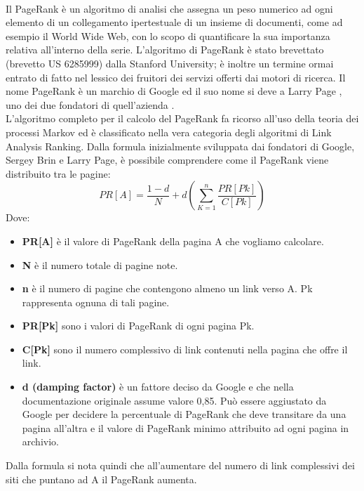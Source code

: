 \\Il PageRank è un algoritmo di analisi che assegna un peso numerico ad ogni elemento di un collegamento ipertestuale di un insieme di documenti, come ad esempio il World Wide Web, con lo scopo di quantificare la sua importanza relativa all'interno della serie. L'algoritmo di PageRank è stato brevettato (brevetto US 6285999) dalla Stanford University; è inoltre un termine ormai entrato di fatto nel lessico dei fruitori dei servizi offerti dai motori di ricerca. Il nome PageRank è un marchio di Google ed il suo nome si deve a Larry Page \cite{pageRank:google}, uno dei due fondatori di quell'azienda \cite{wiki:pageRank}.
\\L'algoritmo completo per il calcolo del PageRank fa ricorso all'uso della teoria dei processi Markov ed è classificato nella vera categoria degli algoritmi di Link Analysis Ranking. Dalla formula inizialmente sviluppata dai fondatori di Google, Sergey Brin e Larry Page, è possibile comprendere come il PageRank viene distribuito tra le pagine:
$$
PR[A] = \frac{1-d}{N} + d  (\sum_{K=1}^n \frac{PR[Pk]}{C[Pk]})
$$
Dove:
\begin{itemize}
\item \textbf{PR[A]} è il valore di PageRank della pagina A che vogliamo calcolare.
\item \textbf{N} è il numero totale di pagine note.
\item \textbf{n} è il numero di pagine che contengono almeno un link verso A. Pk rappresenta ognuna di tali pagine.
\item \textbf{PR[Pk]} sono i valori di PageRank di ogni pagina Pk.
\item \textbf{C[Pk]} sono il numero complessivo di link contenuti nella pagina che offre il link.
\item \textbf{d (damping factor)} è un fattore deciso da Google e che nella documentazione originale assume valore 0,85. Può essere aggiustato da Google per decidere la percentuale di PageRank che deve transitare da una pagina all'altra e il valore di PageRank minimo attribuito ad ogni pagina in archivio.
\end{itemize}
Dalla formula si nota quindi che all'aumentare del numero di link complessivi dei siti che puntano ad A il PageRank aumenta.

